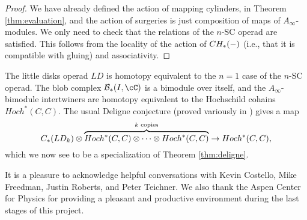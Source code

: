 \documentclass{pnastwo}
\begin{document}
\begin{article}
\begin{proof}
We have already defined the action of mapping cylinders, in Theorem \ref{thm:evaluation}, 
and the action of surgeries is just composition of maps of $A_\infty$-modules. 
We only need to check that the relations of the $n$-SC operad are satisfied. 
This follows from the locality of the action of $CH_*(-)$ (i.e., that it is compatible with gluing) and associativity.
\end{proof} 

The little disks operad $LD$ is homotopy equivalent to 
the $n=1$ case of the $n$-SC operad. The blob complex $\bc_*(I, \cC)$ is a bimodule over itself, and the $A_\infty$-bimodule intertwiners are homotopy equivalent to the Hochschild cohains $Hoch^*(C, C)$. 
The usual Deligne conjecture (proved variously in \cite{hep-th/9403055, MR1805894, MR2064592, MR1805923}) gives a map
\[
	C_*(LD_k)\otimes \overbrace{Hoch^*(C, C)\otimes\cdots\otimes Hoch^*(C, C)}^{\text{$k$ copies}}
			\to  Hoch^*(C, C),
\]
which we now see to be a specialization of Theorem \ref{thm:deligne}.







\begin{acknowledgments}
It is a pleasure to acknowledge helpful conversations with 
Kevin Costello,
Mike Freedman,
Justin Roberts,
and
Peter Teichner.
We also thank the Aspen Center for Physics for providing a pleasant and productive
environment during the last stages of this project.
\end{acknowledgments}



\end{article}
\end{document}
